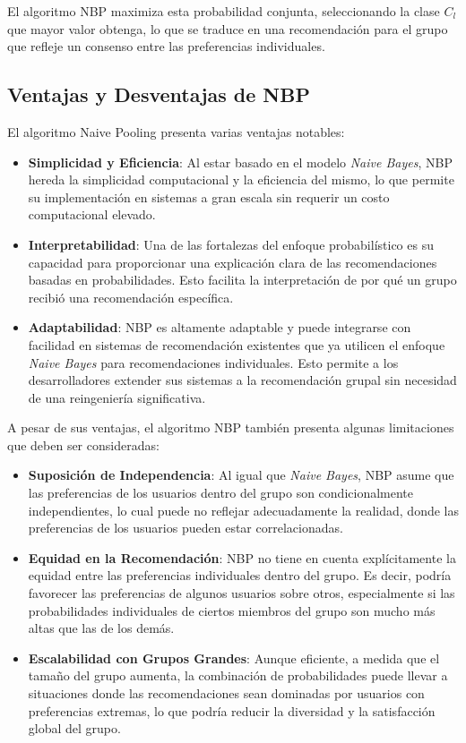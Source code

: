 \documentclass[runningheads,a4paper]{llncs}
\begin{document}
El algoritmo NBP maximiza esta probabilidad conjunta, 
seleccionando la clase $C_l$ que mayor valor obtenga, 
lo que se traduce en una recomendación para el grupo 
que refleje un consenso entre las preferencias 
individuales.

\subsection{Ventajas y Desventajas de NBP}

El algoritmo Naive Pooling presenta varias ventajas notables:
\begin{itemize}
    \item \textbf{Simplicidad y Eficiencia}: 
    Al estar basado en el modelo \textit{Naive Bayes}, 
    NBP hereda la simplicidad computacional y la 
    eficiencia del mismo, lo que permite su 
    implementación en sistemas a gran escala sin 
    requerir un costo computacional elevado.
    \item \textbf{Interpretabilidad}:
    Una de las fortalezas del enfoque probabilístico 
    es su capacidad para proporcionar una explicación 
    clara de las recomendaciones basadas en 
    probabilidades. Esto facilita la interpretación de 
    por qué un grupo recibió una recomendación 
    específica.
    \item \textbf{Adaptabilidad}:
    NBP es altamente adaptable y puede integrarse con 
    facilidad en sistemas de recomendación existentes 
    que ya utilicen el enfoque \textit{Naive Bayes} 
    para recomendaciones individuales. Esto permite a 
    los desarrolladores extender sus sistemas a la 
    recomendación grupal sin necesidad de una 
    reingeniería significativa.
\end{itemize}

A pesar de sus ventajas, el algoritmo NBP también 
presenta algunas limitaciones que deben ser consideradas:

\begin{itemize}
    \item \textbf{Suposición de Independencia}:
    Al igual que \textit{Naive Bayes}, NBP asume que 
    las preferencias de los usuarios dentro del grupo 
    son condicionalmente independientes, lo cual puede 
    no reflejar adecuadamente la realidad, donde las 
    preferencias de los usuarios pueden estar 
    correlacionadas.
    \item \textbf{Equidad en la Recomendación}:
    NBP no tiene en cuenta explícitamente la equidad 
    entre las preferencias individuales dentro del 
    grupo. Es decir, podría favorecer las preferencias 
    de algunos usuarios sobre otros, especialmente si 
    las probabilidades individuales de ciertos miembros 
    del grupo son mucho más altas que las de los demás.
    \item \textbf{Escalabilidad con Grupos Grandes}:
    Aunque eficiente, a medida que el tamaño del grupo 
    aumenta, la combinación de probabilidades puede 
    llevar a situaciones donde las recomendaciones 
    sean dominadas por usuarios con preferencias 
    extremas, lo que podría reducir la diversidad y la 
    satisfacción global del grupo.
\end{itemize}
\end{document}

